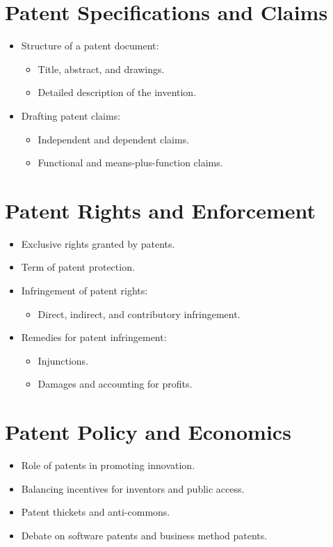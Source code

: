 \section{Patent Specifications and Claims}
\begin{itemize}
    \item Structure of a patent document:
    \begin{itemize}
        \item Title, abstract, and drawings.
        \item Detailed description of the invention.
    \end{itemize}
    \item Drafting patent claims:
    \begin{itemize}
        \item Independent and dependent claims.
        \item Functional and means-plus-function claims.
    \end{itemize}
\end{itemize}

\section{Patent Rights and Enforcement}
\begin{itemize}
    \item Exclusive rights granted by patents.
    \item Term of patent protection.
    \item Infringement of patent rights:
    \begin{itemize}
        \item Direct, indirect, and contributory infringement.
    \end{itemize}
    \item Remedies for patent infringement:
    \begin{itemize}
        \item Injunctions.
        \item Damages and accounting for profits.
    \end{itemize}
\end{itemize}

\section{Patent Policy and Economics}
\begin{itemize}
    \item Role of patents in promoting innovation.
    \item Balancing incentives for inventors and public access.
    \item Patent thickets and anti-commons.
    \item Debate on software patents and business method patents.
\end{itemize}

